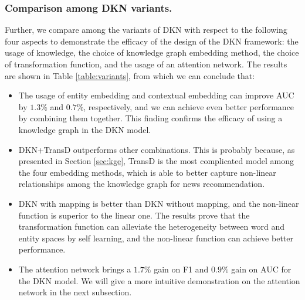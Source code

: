 \documentclass[sigconf]{acmart}
\begin{document}
		\subsubsection{Comparison among DKN variants.}			
			Further, we compare among the variants of DKN with respect to the following four aspects to demonstrate the efficacy of the design of the DKN framework: the usage of knowledge, the choice of knowledge graph embedding method, the choice of transformation function, and the usage of an attention network.
			The results are shown in Table \ref{table:variants}, from which we can conclude that:
			\begin{itemize}
				\item
					The usage of entity embedding and contextual embedding can improve AUC by $1.3\%$ and $0.7\%$, respectively, and we can achieve even better performance by combining them together.
					This finding confirms the efficacy of using a knowledge graph in the DKN model.
				\item
					DKN+TransD outperforms other combinations.
					This is probably because, as presented in Section \ref{sec:kge}, TransD is the most complicated model among the four embedding methods, which is able to better capture non-linear relationships among the knowledge graph for news recommendation.
				\item
					DKN with mapping is better than DKN without mapping, and the non-linear function is superior to the linear one.
					The results prove that the transformation function can alleviate the heterogeneity between word and entity spaces by self learning, and the non-linear function can achieve better performance.
				\item
					The attention network brings a $1.7\%$ gain on F1 and $0.9\%$ gain on AUC for the DKN model.
					We will give a more intuitive demonstration on the attention network in the next subsection.
			\end{itemize}
	
		
	
\end{document}
